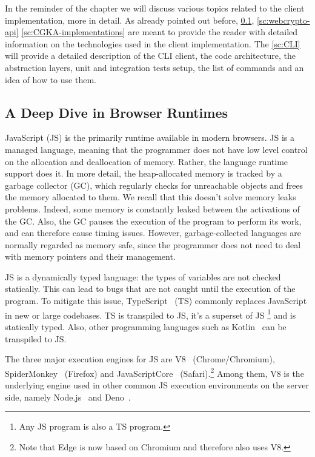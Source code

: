 In the reminder of the chapter we will discuss various topics
related to the client implementation, more in detail.
As already pointed out before, \cref{sc:browser-runtimes}, \cref{sc:webcrypto-api} \cref{sc:CGKA-implementations}
are meant to provide the reader with detailed information 
on the technologies used in the client implementation.
The \cref{sc:CLI} will provide a detailed description of the CLI client,
the code architecture, the abstraction layers, unit and
integration tests setup, the list of commands and an idea of how
to use them.

\subsection{A Deep Dive in Browser Runtimes}\label{sc:browser-runtimes}

JavaScript (JS) is the primarily runtime available in modern browsers.
JS is a managed language, meaning that the programmer
does not have low level control on the allocation and
deallocation of memory. Rather, the language runtime support does it.
In more detail, the heap-allocated memory
is tracked by a garbage collector (GC), which regularly
checks for unreachable objects and frees the memory allocated
to them. We recall that this doesn't solve memory leaks
problems. Indeed, some memory is constantly leaked
between the activations of the GC. Also, the GC
pauses the execution of the program to perform its work,
and can therefore cause timing issues. However, garbage-collected
languages are normally regarded as memory safe, since
the programmer does not need to deal with memory pointers
and their management.


JS is a dynamically
typed language: the types of variables are not checked
statically. This can lead to bugs that are not caught
until the execution of the program.
To mitigate this issue, TypeScript~\cite{bierman2014understanding} (TS)
commonly replaces JavaScript in new or large codebases.
TS is transpiled to JS, it's a superset of JS
\footnote{Any JS program is also a TS program.}
and is statically typed.
Also, other programming languages such as
Kotlin~\cite{KotlinToJs} can be transpiled to JS.

The three major execution engines for JS are V8~\cite{V8} (Chrome/Chromium),
SpiderMonkey~\cite{SpiderMonkey} (Firefox) and JavaScriptCore~\cite{JavaScriptCore} (Safari).\footnote{Note that Edge is now based on Chromium and therefore
also uses V8.}
Among them, V8 is the underlying engine used in other
common JS execution environments on the server side, 
namely Node.js~\cite{NodeJS} and Deno~\cite{Deno}.



